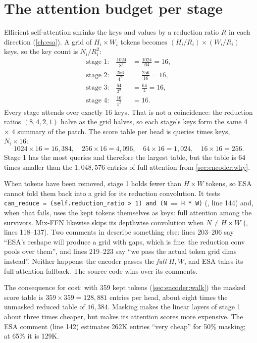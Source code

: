 \section{The attention budget per stage}\label{sec:encoder:attncost}

Efficient self-attention shrinks the keys and values by a reduction ratio $R$
in each direction (\cref{ch:esa}). A grid of $H_i \times W_i$ tokens becomes
$(H_i/R_i) \times (W_i/R_i)$ keys, so the key count is $N_i / R_i^2$:
\begin{align*}
\text{stage 1:}\quad \frac{1024}{8^2} &= \frac{1024}{64} = 16,\\
\text{stage 2:}\quad \frac{256}{4^2} &= \frac{256}{16} = 16,\\
\text{stage 3:}\quad \frac{64}{2^2} &= \frac{64}{4} = 16,\\
\text{stage 4:}\quad \frac{16}{1^2} &= 16.
\end{align*}
Every stage attends over exactly 16 keys. That is not a coincidence: the reduction ratios $(8, 4, 2, 1)$
halve as the grid halves, so each stage's keys form the same 4 $\times$ 4 summary of the patch. The
score table per head is queries times keys, $N_i \times 16$:
\[
1024 \times 16 = 16{,}384, \quad 256 \times 16 = 4{,}096, \quad 64 \times 16 = 1{,}024, \quad 16 \times 16 = 256.
\]
Stage 1 has the most queries and therefore the largest table, but the table is $64$ times smaller than
the $1{,}048{,}576$ entries of full attention from \cref{sec:encoder:why}.

\begin{sourcenote}
When tokens have been removed, stage 1 holds fewer than $H \times W$ tokens, so ESA cannot fold them
back into a grid for its reduction convolution. It tests \lstinline|can_reduce = (self.reduction_ratio > 1) and (N == H * W)| (, line 144) and,
when that fails, uses the kept tokens themselves as keys: full attention among the survivors. Mix-FFN
likewise skips its depthwise convolution when $N \ne H \times W$
(, lines 118--137). Two comments in  describe something
else: lines 203--206 say ``ESA's reshape will produce a grid with gaps, which is fine: the reduction
conv pools over them'', and lines 219--223 say ``we pass the actual token grid dims instead''. Neither
happens: the encoder passes the \emph{full} $H, W$, and ESA takes its full-attention fallback. The
source code wins over its comments.

The consequence for cost: with 359 kept tokens (\cref{sec:encoder:walk}) the masked score table is
$359 \times 359 = 128{,}881$ entries per head\tagC, about eight times the unmasked reduced table of
$16{,}384$. Masking makes the linear layers of stage 1 about three times cheaper, but makes its
attention scores more expensive. The ESA comment (line 142) estimates 262K entries ``very cheap'' for
50\% masking; at 65\% it is 129K.
\end{sourcenote}


